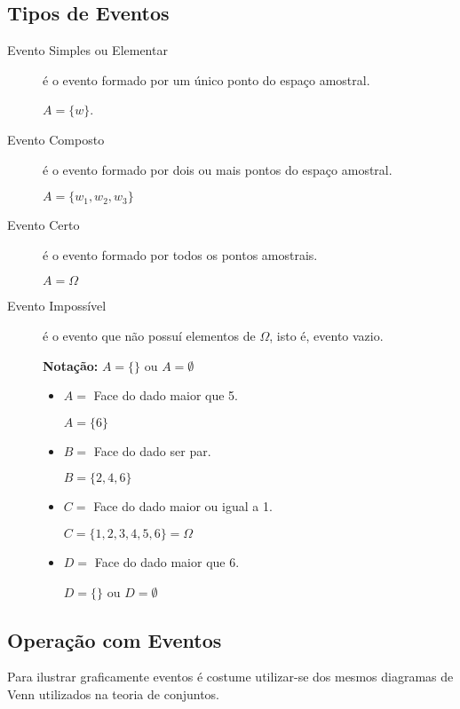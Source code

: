 \subsection{Tipos de Eventos}

\begin{description}
  \item [Evento Simples ou Elementar] é o evento formado por um único ponto do espaço amostral. 
    \begin{example}
        $A=\{w \}$.
      \end{example}
  \item [Evento Composto]  é o evento formado por dois ou mais pontos do espaço amostral.
    \begin{example}
        $ A= \{w_1,w_2,w_3 \}$
      \end{example}
  \item [Evento Certo] é o evento formado por todos os pontos amostrais.
    \begin{example}
      $A= \Omega$ 
    \end{example}
  \item [Evento Impossível] é o evento que não possuí elementos de $\Omega$, isto é, evento vazio.

    \textbf{Notação:} $A=\{\}$ ou $A= \emptyset$
        \begin{example}
        \begin{itemize}[label=]
          \item  $A=$ Face do dado maior que 5.

            $A=\{6\}$
\tcbline
          \item    $B=$ Face do dado ser par.

            $B= \{2,4,6\}$
\tcbline
          \item    $C=$ Face do dado maior ou igual a 1.

            $C= \{1,2,3,4,5,6\}=\Omega$
\tcbline
          \item        $D=$ Face do dado maior que 6.


            $D=\{ \}$ ou $D=\emptyset$
        \end{itemize}
      \end{example}
\end{description}
\subsection{Operação com Eventos}
Para ilustrar graficamente eventos é costume utilizar-se dos mesmos diagramas de Venn utilizados na teoria de conjuntos.

